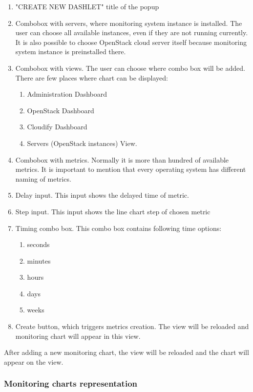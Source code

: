 \begin{enumerate}
\item "CREATE NEW DASHLET" title of the popup
\item Combobox with servers, where monitoring system instance is installed. The user can choose all available instances, even if they are not running currently. It is also possible to choose OpenStack cloud server itself because monitoring system instance is preinstalled there.
\item Combobox with views.  The user can choose where combo box will be added. There are few places where chart can be displayed:
\begin{enumerate}
\item Administration Dashboard
\item OpenStack Dashboard
\item Cloudify Dashboard
\item Servers (OpenStack instances) View. 
\end{enumerate}
\item Combobox with metrics. Normally it is more than hundred of available metrics. It is important to mention that every operating system has different naming of metrics.
\item Delay input. This input shows the delayed time of metric.
\item Step input. This input shows the line chart step of chosen metric
\item Timing combo box. This combo box contains following time options:
\begin{enumerate}
\item seconds
\item minutes
\item hours
\item days
\item weeks
\end{enumerate}
\item Create button, which triggers metrics creation. The view will be reloaded and monitoring chart will appear in this view.
\end{enumerate}

After adding a new monitoring chart, the view will be reloaded and the chart will appear on the view. 

\subsubsection{Monitoring charts representation}\label{Monitoring chart representation}


